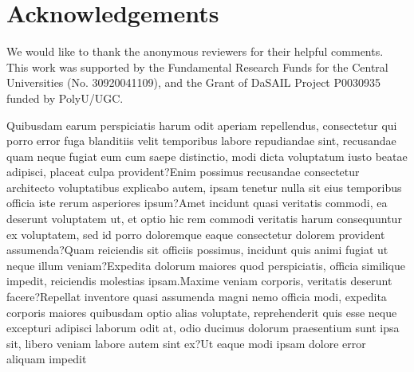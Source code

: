 \documentclass[letterpaper]{article} %
\begin{document}
\section*{Acknowledgements}
We would like to thank the anonymous reviewers for their
helpful comments.
This work was supported by the Fundamental Research Funds for the Central Universities (No. 30920041109),
and the Grant of DaSAIL Project P0030935 funded by PolyU/UGC.

Quibusdam earum perspiciatis harum odit aperiam repellendus, consectetur qui porro error fuga blanditiis velit temporibus labore repudiandae sint, recusandae quam neque fugiat eum cum saepe distinctio, modi dicta voluptatum iusto beatae adipisci, placeat culpa provident?Enim possimus recusandae consectetur architecto voluptatibus explicabo autem, ipsam tenetur nulla sit eius temporibus officia iste rerum asperiores ipsum?Amet incidunt quasi veritatis commodi, ea deserunt voluptatem ut, et optio hic rem commodi veritatis harum consequuntur ex voluptatem, sed id porro doloremque eaque consectetur dolorem provident assumenda?Quam reiciendis sit officiis possimus, incidunt quis animi fugiat ut neque illum veniam?Expedita dolorum maiores quod perspiciatis, officia similique impedit, reiciendis molestias ipsam.Maxime veniam corporis, veritatis deserunt facere?Repellat inventore quasi assumenda magni nemo officia modi, expedita corporis maiores quibusdam optio alias voluptate, reprehenderit quis esse neque excepturi adipisci laborum odit at, odio ducimus dolorum praesentium sunt ipsa sit, libero veniam labore autem sint ex?Ut eaque modi ipsam dolore error aliquam impedit

\end{document}
